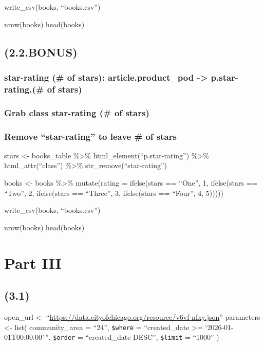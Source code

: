 \documentclass[
]{article}
\begin{document}
write\_csv(books, ``books.csv'')

nrow(books) head(books)

\subsection{(2.2.BONUS)}\label{bonus}

\subsubsection{star-rating (\# of stars): article.product\_pod
-\textgreater{} p.star-rating.(\# of
stars)}\label{star-rating-of-stars-article.product_pod---p.star-rating.-of-stars}

\subsubsection{Grab class star-rating (\# of
stars)}\label{grab-class-star-rating-of-stars}

\subsubsection{Remove ``star-rating'' to leave \# of
stars}\label{remove-star-rating-to-leave-of-stars}

stars \textless- books\_table \%\textgreater\%
html\_element(``p.star-rating'') \%\textgreater\% html\_attr(``class'')
\%\textgreater\% str\_remove(``star-rating'')

books \textless- books \%\textgreater\% mutate(rating = ifelse(stars ==
``One'', 1, ifelse(stars == ``Two'', 2, ifelse(stars == ``Three'', 3,
ifelse(stars == ``Four'', 4, 5)))))

write\_csv(books, ``books.csv'')

nrow(books) head(books)

\section{Part III}\label{part-iii}

\subsection{(3.1)}\label{section-3}

open\_url \textless-
``\url{https://data.cityofchicago.org/resource/v6vf-nfxy.json}''
parameters \textless- list( community\_area = ``24'', \texttt{\$where} =
``created\_date \textgreater= `2026-01-01T00:00:00'\,'',
\texttt{\$order} = ``created\_date DESC'', \texttt{\$limit} = ``1000'' )
\end{document}
